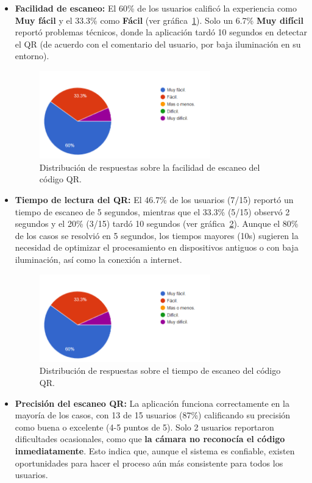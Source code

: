 \begin{itemize}
	\item \textbf{Facilidad de escaneo:} 
	El 60\% de los usuarios calificó la experiencia como \textbf{Muy fácil} y el 33.3\% como \textbf{Fácil} (ver gráfica~\ref{fig:facilidad-escaneo}). 
	Solo un 6.7\% \textbf{Muy difícil} reportó problemas técnicos, donde la aplicación tardó 10 segundos en detectar el QR (de acuerdo con el comentario del usuario, por baja iluminación en su entorno).
	
	\begin{figure}[H]
		\centering
		\includegraphics[width=0.7\textwidth]{images/grafico_escaneo.png}
		\caption{Distribución de respuestas sobre la facilidad de escaneo del código QR.}
		\label{fig:facilidad-escaneo}
	\end{figure}
	
	\item \textbf{Tiempo de lectura del QR:}  
	El 46.7\% de los usuarios (7/15) reportó un tiempo de escaneo de 5 segundos, mientras que el 33.3\% (5/15) observó 2 segundos y el 20\% (3/15) tardó 10 segundos (ver gráfica~\ref{fig:tiempo-escaneo}).  
	Aunque el 80\% de los casos se resolvió en 5 segundos, los tiempos mayores (10s) sugieren la necesidad de optimizar el procesamiento en dispositivos antiguos o con baja iluminación, así como la conexión a internet.
	
	\begin{figure}[H]
		\centering
		\includegraphics[width=0.7\textwidth]{images/grafico_escaneo.png}
		\caption{Distribución de respuestas sobre el tiempo de escaneo del código QR.}
		\label{fig:tiempo-escaneo}
	\end{figure}
	
	\item \textbf{Precisión del escaneo QR:} 
	La aplicación funciona correctamente en la mayoría de los casos, con 13 de 15 usuarios (87\%) calificando su precisión como buena o excelente (4-5 puntos de 5). 
	Solo 2 usuarios reportaron dificultades ocasionales, como que \textbf{la cámara no reconocía el código inmediatamente}. Esto indica que, aunque el sistema es confiable, existen oportunidades para hacer el proceso aún más consistente para todos los usuarios.
\end{itemize}


